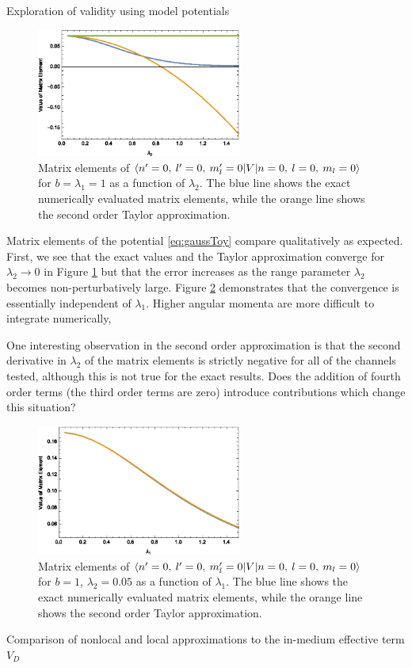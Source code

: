 \begin{section}{Exploration of validity using model potentials \label{sec:toyModel}}
\begin{figure}[htb]
\centering \includegraphics[width=0.6\textwidth]{LocalExpansion/Figures/ToyPotential000000} 
\caption{Matrix elements of $\braket{n'=0,\: l'=0,\: m_l'=0 | V | n=0,\: l=0,\: m_l=0}$ for $b=\lambda_1=1$ as a function of $\lambda_2$. The blue line shows the exact numerically evaluated matrix elements, while the orange line shows the second order Taylor approximation.
\label{fig:gaussToy1}}
\end{figure}

Matrix elements of the potential \eqref{eq:gaussToy} compare qualitatively as expected. First, we see that the exact values and the Taylor approximation converge for $\lambda_2\rightarrow 0$ in Figure \ref{fig:gaussToy1} but that the error increases as the range parameter $\lambda_2$ becomes non-perturbatively large. Figure \ref{fig:gaussToy2} demonstrates that the convergence is essentially independent of $\lambda_1$. Higher angular momenta are more difficult to integrate numerically, 

One interesting observation in the second order approximation is that the second derivative in $\lambda_2$ of the matrix elements is strictly negative for all of the channels tested, although this is not true for the exact results. Does the addition of fourth order terms (the third order terms are zero) introduce contributions which change this situation?

\begin{figure}[htb]
\centering \includegraphics[width=0.6\textwidth]{LocalExpansion/Figures/ToyPotential000000l1} 
\caption{Matrix elements of $\braket{n'=0,\: l'=0,\: m_l'=0 | V | n=0,\: l=0,\: m_l=0}$ for $b=1$, $\lambda_2=0.05$ as a function of $\lambda_1$. The blue line shows the exact numerically evaluated matrix elements, while the orange line shows the second order Taylor approximation.
\label{fig:gaussToy2}}
\end{figure}



\end{section}
\begin{section}{Comparison of nonlocal and local approximations to the in-medium effective term $V_D$ }

\end{section}
